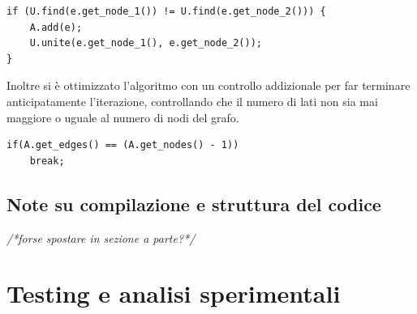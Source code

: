 \documentclass[]{article}
\begin{document}
\begin{flushleft}
\lstset{language=c++, style=mystyle, firstnumber=9} 	 	
\begin{lstlisting}
if (U.find(e.get_node_1()) != U.find(e.get_node_2())) {
	A.add(e);
    U.unite(e.get_node_1(), e.get_node_2());
}
\end{lstlisting}

\medskip
Inoltre si è ottimizzato l'algoritmo con un controllo addizionale per far terminare anticipatamente l'iterazione, controllando che il numero di lati non sia mai maggiore o uguale al numero di nodi del grafo.

\lstset{language=c++, style=mystyle, firstnumber=13}
\begin{lstlisting}
if(A.get_edges() == (A.get_nodes() - 1))
    break;
\end{lstlisting}
\end{flushleft}
\subsection{Note su compilazione e struttura del codice}
\textit{/*forse spostare in sezione a parte?*/}
\newpage
\section{Testing e analisi sperimentali}
\end{document}
